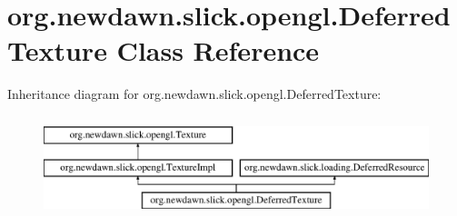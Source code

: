 \hypertarget{classorg_1_1newdawn_1_1slick_1_1opengl_1_1_deferred_texture}{}\section{org.\+newdawn.\+slick.\+opengl.\+Deferred\+Texture Class Reference}
\label{classorg_1_1newdawn_1_1slick_1_1opengl_1_1_deferred_texture}
Inheritance diagram for org.\+newdawn.\+slick.\+opengl.\+Deferred\+Texture\+:\begin{figure}[H]
\begin{center}
\leavevmode
\includegraphics[height=3.000000cm]{classorg_1_1newdawn_1_1slick_1_1opengl_1_1_deferred_texture}
\end{center}
\end{figure}
